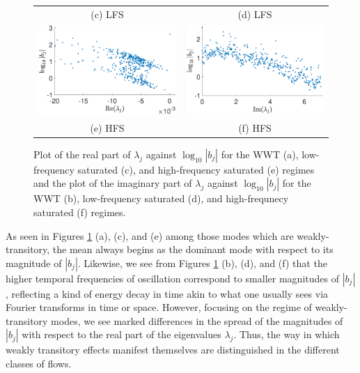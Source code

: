 \documentclass[aps,prl,preprint,groupedaddress]{revtex4-1}
\begin{document}
\begin{figure}[!ht]
\begin{tabular}{cc}
(c) LFS & (d) LFS\\
\includegraphics[width=.525\textwidth]{bvals_vs_real_lam_hfforce_K_256_Lx_128_tf_2e4} &\hspace{-25pt} \includegraphics[width=.525\textwidth]{bvals_vs_imag_lam_hfforce_K_256_Lx_128_tf_2e4}\\
(e) HFS & (f) HFS
\end{tabular}
\caption{Plot of the real part of $\lambda_{j}$ against $\log_{10}|b_{j}|$ for the WWT (a), low-frequency saturated (c), and high-frequency saturated (e) regimes and the plot of the imaginary part of $\lambda_{j}$ against $\log_{10}|b_{j}|$  for the WWT (b), low-frequency saturated (d), and high-frequnecy saturated (f) regimes.}
\label{fig:wkosccomp}
\end{figure}
As seen in  Figures \ref{fig:wkosccomp} (a), (c), and (e) among those modes which are weakly-transitory, the mean always begins as the dominant mode with respect to its magnitude of $|b_{j}|$.  Likewise, we see from Figures \ref{fig:wkosccomp} (b), (d), and (f) that the higher temporal frequencies of oscillation correspond to smaller magnitudes of $|b_{j}|$, reflecting a kind of energy decay in time akin to what one usually sees via Fourier transforms in time or space.  However, focusing on the regime of weakly-transitory modes, we see marked differences in the spread of the magnitudes of $|b_{j}|$ with respect to the real part of the eigenvalues $\lambda_{j}$.  Thus, the way in which weakly transitory effects manifest themselves are distinguished in the different classes of flows.  
\end{document}
